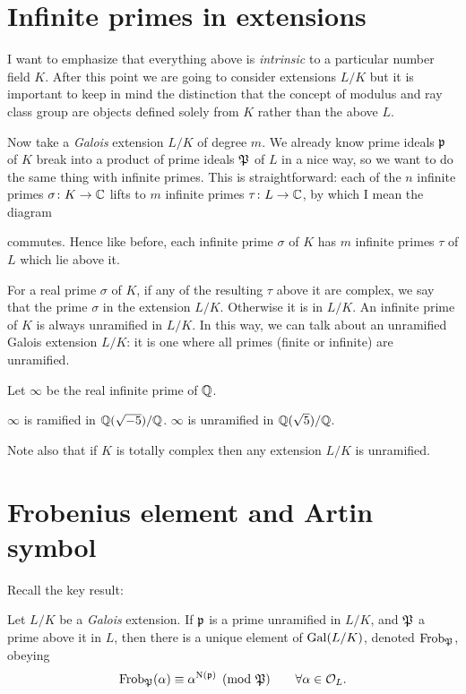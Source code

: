 \section{Infinite primes in extensions}
I want to emphasize that everything above is
\emph{intrinsic} to a particular number field $K$.
After this point we are going to consider extensions $L/K$
but it is important to keep in mind the distinction that
the concept of modulus and ray class group are objects
defined solely from $K$ rather than the above $L$.

Now take a \emph{Galois} extension $L/K$ of degree $m$.
We already know prime ideals $\mathfrak p$ of $K$ break into
a product of prime ideals $\mathfrak P$ of $L$ in a nice way,
so we want to do the same thing with infinite primes.
This is straightforward: each of the $n$ infinite primes
$\sigma \colon K \to \mathbb C$ lifts to $m$ infinite primes $\tau \colon L \to \mathbb C$,
by which I mean the diagram
\begin{center}
\end{center}
commutes.
Hence like before, each infinite prime $\sigma$ of $K$
has $m$ infinite primes $\tau$ of $L$ which lie above it.

For a real prime $\sigma$ of $K$, if any of the resulting $\tau$ above it
are complex, we say that the prime $\sigma$ 
in the extension $L/K$. Otherwise it is  in $L/K$.
An infinite prime of $K$ is always unramified in $L/K$.
In this way, we can talk about an unramified Galois extension $L/K$:
it is one where all primes (finite or infinite) are unramified.

\begin{example}
	Let $\infty$ be the real infinite prime of $\mathbb Q$.
	\begin{itemize}
		\ii $\infty$ is ramified in $\mathbb Q(\sqrt{-5})/\mathbb Q$.
		\ii $\infty$ is unramified in $\mathbb Q(\sqrt{5})/\mathbb Q$.
	\end{itemize}
	Note also that if $K$ is totally complex
	then any extension $L/K$ is unramified.
\end{example}

\section{Frobenius element and Artin symbol}
Recall the key result:
\begin{theorem}
	Let $L/K$ be a \emph{Galois} extension.
	If $\mathfrak p$ is a prime unramified in $L/K$, and $\mathfrak P$ a prime above it in $L$,
	then there is a unique element of $\operatorname{Gal}(L/K)$, denoted $\mathrm{Frob}_\mathfrak P$, obeying
	\[ \mathrm{Frob}_\mathfrak P(\alpha) \equiv \alpha^{\operatorname{N}(\mathfrak p)} \pmod{\mathfrak P}
		\qquad \forall \alpha \in \mathcal O_L. \]
\end{theorem}

